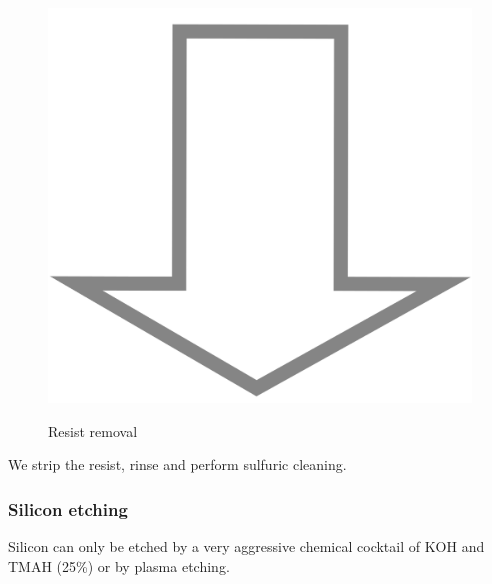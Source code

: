 \begin{figure}[H]
	\centering
	\begin{tikzpicture}[node distance = 3cm, auto, thick,scale=\CrossSectionOnly, every node/.style={transform shape}]
		
	\end{tikzpicture} \\
	\includegraphics[scale=0.01]{down_arrow.png} \\
	\begin{tikzpicture}[node distance = 3cm, auto, thick,scale=\CrossSectionOnly, every node/.style={transform shape}]
		
	\end{tikzpicture}
	\caption{Resist removal}
\end{figure}

We strip the resist, rinse and perform sulfuric cleaning.

\subsubsection{Silicon etching}\label{sti_trench_etch}

Silicon can only be etched by a very aggressive chemical cocktail of  KOH and TMAH (25\%) or by plasma etching.

